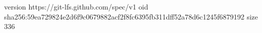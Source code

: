 version https://git-lfs.github.com/spec/v1
oid sha256:59ea729824e2d6f9c0679882acf2f8fc6395fb311dff52a78d6c1245f6879192
size 336
